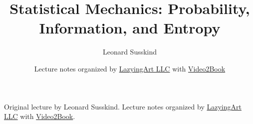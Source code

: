 \documentclass[11pt,oneside]{book}
\begin{document}
\frontmatter
\hypersetup{pageanchor=false}
\title{Statistical Mechanics: Probability, Information, and Entropy}
\author{Leonard Susskind}
\date{Lecture notes organized by \href{https://lazying.art}{LazyingArt LLC} with \href{https://github.com/lachlanchen/Video2Book}{Video2Book}}
\maketitle
\begin{center}
\small Original lecture by Leonard Susskind. Lecture notes organized by \href{https://lazying.art}{LazyingArt LLC} with \href{https://github.com/lachlanchen/Video2Book}{Video2Book}.
\end{center}
\clearpage
\hypersetup{pageanchor=true}
\mainmatter

\end{document}
